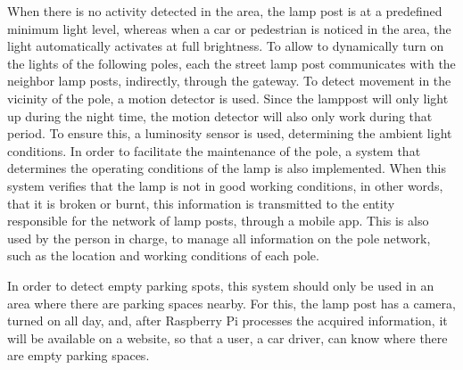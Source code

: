 When there is no activity detected in the area, the lamp post is at a predefined minimum light level, whereas when a car or pedestrian is noticed in the area, the light automatically activates at full brightness. To allow to dynamically turn on the lights of the following poles, each the street lamp post communicates with the neighbor lamp posts, indirectly, through the gateway. To detect movement in the vicinity of the pole, a motion detector is used. Since the lamppost will only light up during the night time, the motion detector will also only work during that period. To ensure this, a luminosity sensor is used, determining the ambient light conditions. In order to facilitate the maintenance of the pole, a system that determines the operating conditions of the lamp is also implemented. When this system verifies that the lamp is not in good working conditions, in other words, that it is broken or burnt, this information is transmitted to the entity responsible for the network of lamp posts, through a mobile app. This is also used by the person in charge, to manage all information on the pole network, such as the location and working conditions of each pole.

In order to detect empty parking spots, this system should only be used in an area where there are parking spaces nearby. For this, the lamp post has a camera, turned on all day, and, after Raspberry Pi processes the acquired information, it will be available on a website, so that a user, a car driver, can know where there are empty parking spaces.


